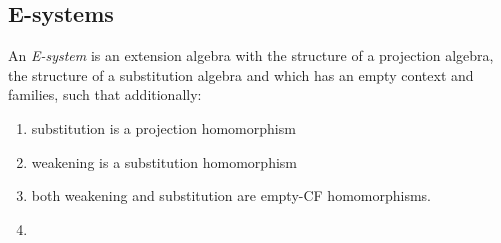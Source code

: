 \subsection{E-systems}
\begin{defn}
An \emph{E-system} is an extension algebra with the structure of a projection algebra,
the structure of a substitution algebra and which has an empty context and families,
such that additionally:
\begin{enumerate}
\item substitution is a projection homomorphism
\item weakening is a substitution homomorphism
\item both weakening and substitution are empty-CF homomorphisms.
\item 
\end{enumerate}
\end{defn}
